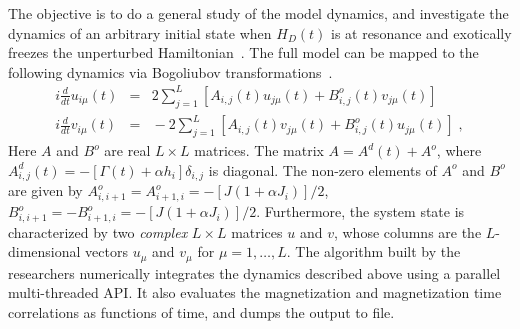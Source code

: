 \documentclass[a4paper,10pt]{report}
\begin{document}
The objective is to do a general study of the model dynamics, and investigate the dynamics of an arbitrary initial state when $H_D(t)$ is at resonance and exotically freezes the unperturbed Hamiltonian~\cite{arnab1}. The full model can be mapped to the following dynamics via Bogoliubov transformations~\cite{isingrand}.
\begin{eqnarray} \label{BdG_tdep:eqn}
i\frac{d}{dt}u_{i\mu}(t) \!\! &=&  
{2} \sum_{j=1}^{L} \left[A_{i,j}(t)u_{j\mu}(t)+B^o_{i,j}(t)v_{j\mu}(t) \right] 
\nonumber \\
i\frac{d}{dt}v_{i\mu}(t) \!\! &=& \!\! 
-{2}\sum_{j=1}^{L} \left[A_{i,j}(t)v_{j\mu}(t)+B^o_{i,j}(t)u_{j\mu}(t) \right] 
\;,
\end{eqnarray}
Here $A$ and $B^o$ are real $L\times L$ matrices. The matrix $A=A^d(t)+A^o$, where $A^d_{i,j}(t)=-\left[\Gamma(t)+\alpha h_i\right]\delta_{i,j}$ is diagonal. The
non-zero elements of $A^o$ and $B^o$ are given by $A^o_{i,i+1}=A^o_{i+1,i}=-\left[J\left(1+\alpha J_i\right)\right]/2$, $B^o_{i,i+1}=-B^o_{i+1,i}=-\left[J\left(1+\alpha J_i\right)\right]/2$. Furthermore, the system state is characterized by two \textit{complex} $L\times L$ matrices $u$ and $v$, whose columns are the $L$-dimensional vectors $u_\mu$ and $v_\mu$ for $\mu=1,\dots,L$. The algorithm built by the researchers numerically integrates the dynamics described above using a parallel multi-threaded API. It also evaluates the magnetization and magnetization time correlations as functions of time, and dumps the output to file. 
\end{document}
